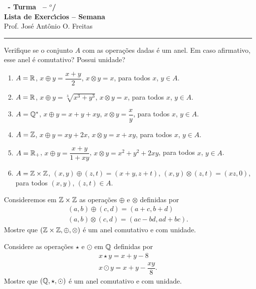 \documentclass[12pt]{exam}
\begin{document}
    \begin{center}
    {\Large\bf \disciplina\ - Turma \turma\ -- \semestre$^{o}$/\ano} \\ \vspace{9pt} {\large\bf
        Lista de Exerc{\'\i}cios -- Semana \numerosemana}\\ \vspace{9pt} Prof. Jos{\'e} Ant{\^o}nio O. Freitas
    \end{center}
    \hrule

    \vspace{.6cm}

    \questao{} Verifique se o conjunto $A$ com as opera\c{c}\~oes dadas \'e um anel. Em caso afirmativo, esse anel \'e comutativo? Possui unidade?
    \begin{enumerate}[label={\alph*})]
        \item $A = \mathbb{R}$, $x \oplus y = \dfrac{x + y}{2}$, $x \otimes y = x$, para todos $x$, $y \in A$.
        \item $A = \mathbb{R}$, $x \oplus y = \sqrt[3]{x^3 + y^3}$, $x \otimes y = x$, para todos $x$, $y \in A$.
        \item $A = \mathbb{Q}^*$, $x \oplus y = x + y + xy$, $x \otimes y = \dfrac{x}{y}$, para todos $x$, $y \in A$.
        \item $A = \mathbb{Z}$, $x \oplus y = xy + 2x$, $x \otimes y = x + xy$, para todos $x$, $y \in A$.
        \item $A = \mathbb{R}_+$, $x \oplus y = \dfrac{x + y}{1 + xy}$, $x \otimes y = x^2 + y^2 + 2xy$, para todos $x$, $y \in A$.
        \item $A = \mathbb{Z} \times \mathbb{Z}$, $(x, y) \oplus (z, t) = (x + y, z + t)$, $(x, y) \otimes (z, t) = (xz, 0)$, para todos $(x, y)$, $(z, t) \in A$.
    \end{enumerate}

    \vspace{.3cm}

    \questao{} Consideremos em $\mathbb{Z} \times \mathbb{Z}$ as opera\c{c}\~oes $\oplus$ e $\otimes$ definidas por
    \begin{align*}
        (a, b) \oplus (c, d) = (a + c, b + d)\\
        (a ,b) \otimes (c, d) = (ac - bd, ad + bc).
    \end{align*}
    Mostre que $(\mathbb{Z} \times \mathbb{Z}, \oplus, \otimes)$ \'e um anel comutativo e com unidade.

    \vspace{.3cm}

    \questao{} Considere as opera\c{c}\~oes $\star$ e $\odot$ em $\mathbb{Q}$ definidas por
    \begin{align*}
        x \star y = x + y - 8\\
        x \odot y = x + y - \dfrac{xy}{8}.
    \end{align*}
    Mostre que $(\mathbb{Q}, \star, \odot)$ \'e um anel comutativo e com unidade.
\end{document}
